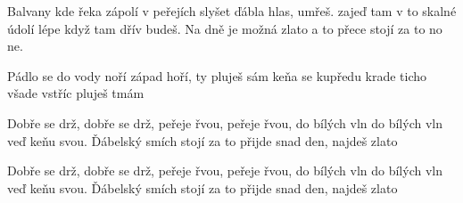 
\beginverse{}
Balvany kde řeka zápolí
v peřejích slyšet ďábla hlas, umřeš.
zajeď tam v to skalné údolí
lépe když tam dřív budeš.
Na dně je možná zlato
a to přece stojí za to no ne.
\endverse{}

\beginverse{}
Pádlo se do vody noří
západ hoří, ty pluješ sám
keňa se kupředu krade
ticho všade vstříc pluješ tmám
\endverse{}

\beginchorus{}
Dobře se drž, dobře se drž,
peřeje řvou, peřeje řvou,
do bílých vln do bílých vln
veď keňu svou.
Ďábelský smích stojí za to
přijde snad den, najdeš zlato
\endchorus{}

\repeatingchorus{}
\beginchorus{}
Dobře se drž, dobře se drž,
peřeje řvou, peřeje řvou,
do bílých vln do bílých vln
veď keňu svou.
Ďábelský smích stojí za to
přijde snad den, najdeš zlato
\endchorus{}

\endsong{}
